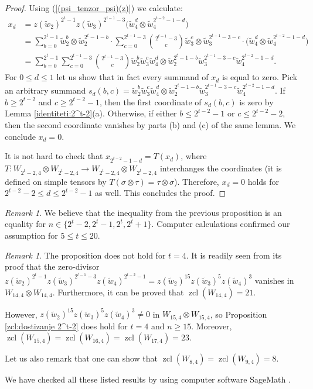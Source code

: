 \documentclass{amsart}
\theoremstyle{definition}
\theoremstyle{remark}
\newtheorem{remark}[theorem]{Remark}
\numberwithin{equation}{section}
\newcommand{\w}{\widetilde w}
\newcommand{\zcl}{\operatorname{zcl}}
\newcommand{\arr}{\rightarrow}
\renewcommand{\le}{\leqslant}
\renewcommand{\ge}{\geqslant}
\begin{document}
\begin{proof}
Using (\ref{(psi_tenzor_psi)(z)}) we calculate:
\begin{align*}
    x_d&=z(\w_2)^{2^t-1}z(\w_3)^{2^{t-1}-3}\big(\w_4^d\otimes\w_4^{2^{t-2}-1-d}\big)\\
    &=\sum_{b=0}^{2^t-1}\w_2^b\otimes\w_2^{2^t-1-b}\cdot\sum_{c=0}^{2^{t-1}-3}\binom{2^{t-1}-3}{c}\w_3^c\otimes\w_3^{2^{t-1}-3-c}\cdot\big(\w_4^d\otimes\w_4^{2^{t-2}-1-d}\big)\\
    &=\sum_{b=0}^{2^t-1}\sum_{c=0}^{2^{t-1}-3}\binom{2^{t-1}-3}{c}\w_2^b\w_3^c\w_4^d\otimes\w_2^{2^t-1-b}\w_3^{2^{t-1}-3-c}\w_4^{2^{t-2}-1-d}.
\end{align*}
For $0\le d\le1$ let us show that in fact every summand of $x_d$ is equal to zero. Pick an arbitrary summand $s_d(b,c)=\w_2^b \w_3^c \w_4^d \otimes \w_2^{2^t - 1- b} \w_3^{2^{t-1} - 3 - c} \w_4^{2^{t-2} - 1-d}$. If $b \ge 2^{t-2}$ and $c \ge 2^{t-2} -1$, then the first coordinate of $s_d(b,c)$ is zero by Lemma \ref{identiteti:2^t-2}(a). Otherwise, if either $b \le 2^{t-2} - 1$ or $c \le 2^{t-2} - 2$, then the second coordinate vanishes by parts (b) and (c) of the same lemma. We conclude $x_d=0$.

It is not hard to check that $x_{2^{t-2}-1-d}=T(x_d)$, where $T:W_{2^t-2,4}\otimes W_{2^t-2,4}\arr W_{2^t-2,4}\otimes W_{2^t-2,4}$ interchanges the coordinates (it is defined on simple tensors by $T(\sigma\otimes\tau)=\tau\otimes\sigma$). Therefore, $x_d=0$ holds for $2^{t-2}-2\le d\le2^{t-2}-1$ as well. This concludes the proof.
\end{proof}



\begin{remark}
    We believe that the inequality from the previous proposition is an equality for $n\in\{2^t-2,2^t-1,2^t,2^t+1\}$. Computer calculations confirmed our assumption for $5\le t\le 20$.
\end{remark}

\begin{remark}\label{remark2}
    The proposition does not hold for $t=4$. It is readily seen from its proof that the zero-divisor $z(\w_2)^{2^t-1}z(\w_3)^{2^{t-1}-3}z(\w_4)^{2^{t-2}-1}=z(\w_2)^{15}z(\w_3)^5z(\w_4)^3$ vanishes in $W_{14,4}\otimes W_{14,4}$. Furthermore, it can be proved that $\zcl(W_{14,4})=21$. 

    However, $z(\w_2)^{15}z(\w_3)^5z(\w_4)^3\ne0$ in $W_{15,4}\otimes W_{15,4}$, so Proposition \ref{zcl:dostizanje 2^t-2} does hold for $t=4$ and $n\ge15$. Moreover, $\zcl(W_{15,4})=\zcl(W_{16,4})=\zcl(W_{17,4})=23$.

    Let us also remark that one can show that $\zcl(W_{8,4})=\zcl(W_{9,4})=8$.

    We have checked all these listed results by using computer software SageMath \cite{Sage}.
\end{remark}
\end{document}
